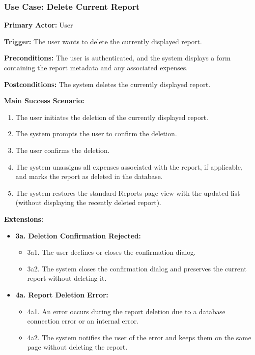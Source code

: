 \subsubsection{\textbf{Use Case: Delete Current Report}}

\textbf{Primary Actor:} User

\textbf{Trigger:} The user wants to delete the currently displayed report.

\textbf{Preconditions:} The user is authenticated, and the system displays a form containing the report metadata and any associated expenses.

\textbf{Postconditions:} The system deletes the currently displayed report.

\vspace{0.5cm}

\textbf{Main Success Scenario:}

\begin{enumerate} [leftmargin=0.75cm, noitemsep]
\item The user initiates the deletion of the currently displayed report.
\item The system prompts the user to confirm the deletion.
\item The user confirms the deletion.
\item The system unassigns all expenses associated with the report, if applicable, and marks the report as deleted in the database.
\item The system restores the standard Reports page view with the updated list (without displaying the recently deleted report).
\end{enumerate}

\vspace{0.3cm}

\textbf{Extensions:}

\begin{itemize} [label={}, leftmargin=0.75cm, noitemsep]

    \item \textbf{3a. Deletion Confirmation Rejected:}
    \begin{itemize} [label={}, leftmargin=0.75cm, noitemsep]
        \item 3a1. The user declines or closes the confirmation dialog.
        \item 3a2. The system closes the confirmation dialog and preserves the current report without deleting it.
    \end{itemize}

    \item \textbf{4a. Report Deletion Error:}
    \begin{itemize} [label={}, leftmargin=0.75cm, noitemsep]
        \item 4a1. An error occurs during the report deletion due to a database connection error or an internal error.
        \item 4a2. The system notifies the user of the error and keeps them on the same page without deleting the report.
    \end{itemize}

\end{itemize}

\vspace{0.3cm}

